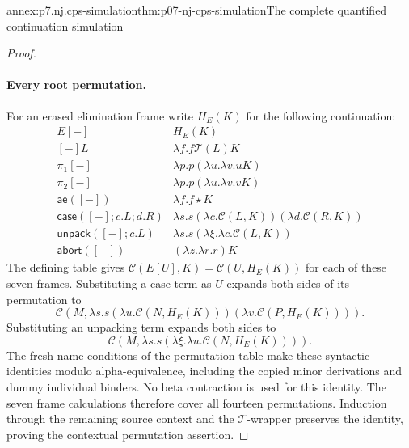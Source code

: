 \begin{annexitem}{annex:p7.nj.cps-simulation}{thm:p07-nj-cps-simulation}{The complete quantified continuation simulation}
\begin{proof}
\paragraph{Every root permutation.}
For an erased elimination frame write \(H_E(K)\) for the
following continuation:
\[
\begin{array}{c|l}
E[-]&H_E(K)\\ \hline
[-]L&\lambda f.f\mathcal T(L)K\\
\pi_1[-]&\lambda p.p(\lambda u.\lambda v.uK)\\
\pi_2[-]&\lambda p.p(\lambda u.\lambda v.vK)\\
\mathsf{ae}([-])&\lambda f.f\star K\\
\mathsf{case}([-];c.L;d.R)&
 \lambda s.s(\lambda c.\mathcal C(L,K))(\lambda d.\mathcal C(R,K))\\
\mathsf{unpack}([-];c.L)&
 \lambda s.s(\lambda\xi.\lambda c.\mathcal C(L,K))\\
\mathsf{abort}([-])&(\lambda z.\lambda r.r)K
\end{array}
\]
The defining table gives
\(\mathcal C(E[U],K)=\mathcal C(U,H_E(K))\) for each
of these seven frames. Substituting a case term as \(U\)
expands both sides of its permutation to
\[
 \mathcal C(M,\lambda s.s
       (\lambda u.\mathcal C(N,H_E(K)))
       (\lambda v.\mathcal C(P,H_E(K)))).
\]
Substituting an unpacking term expands both sides to
\[
 \mathcal C(M,\lambda s.s
       (\lambda\xi.\lambda u.\mathcal C(N,H_E(K)))).
\]
The fresh-name conditions of the permutation table make
these syntactic identities modulo alpha-equivalence, including
the copied minor derivations and dummy individual binders.
No beta contraction is used for this identity. The seven
frame calculations therefore cover all fourteen permutations.
Induction through the remaining source context and the
\(\mathcal T\)-wrapper preserves the identity, proving
the contextual permutation assertion.
\end{proof}
\end{annexitem}

